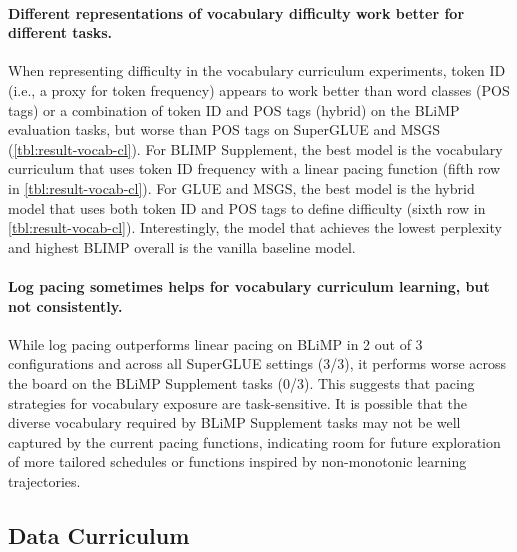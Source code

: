 \paragraph{Different representations of vocabulary difficulty work better for different tasks.}
When representing difficulty in the vocabulary curriculum experiments, token ID (i.e., a proxy for token frequency) appears to work better than word classes (POS tags) or a combination of token ID and POS tags (hybrid) on the BLiMP evaluation tasks, but worse than POS tags on SuperGLUE and MSGS (\cref{tbl:result-vocab-cl}). For BLIMP Supplement, the best model is the vocabulary curriculum that uses token ID frequency with a linear pacing function (fifth row in \cref{tbl:result-vocab-cl}). For GLUE and MSGS, the best model is the hybrid model that uses both token ID and POS tags to define difficulty (sixth row in \cref{tbl:result-vocab-cl}). Interestingly, the model that achieves the lowest perplexity and highest BLIMP overall is the vanilla baseline model. 

\paragraph{Log pacing sometimes helps for vocabulary curriculum learning, but not consistently.}
While log pacing outperforms linear pacing on BLiMP in 2 out of 3 configurations and across all SuperGLUE settings (3/3), it performs worse across the board on the BLiMP Supplement tasks (0/3). This suggests that pacing strategies for vocabulary exposure are task-sensitive. It is possible that the diverse vocabulary required by BLiMP Supplement tasks may not be well captured by the current pacing functions, indicating room for future exploration of more tailored schedules or functions inspired by non-monotonic learning trajectories.

\subsection{Data Curriculum}

